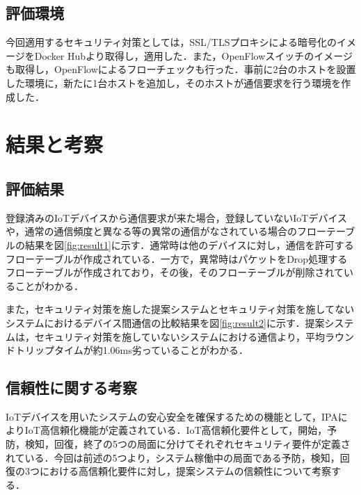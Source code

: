 \documentclass[Japanese]{dicomopapers}
\begin{document}
\subsection{評価環境}
今回適用するセキュリティ対策としては，SSL/TLSプロキシによる暗号化のイメージをDocker Hubより取得し，適用した．また，OpenFlowスイッチのイメージも取得し，OpenFlowによるフローチェックも行った．事前に2台のホストを設置した環境に，新たに1台ホストを追加し，そのホストが通信要求を行う環境を作成した．


\section{結果と考察}
\subsection{評価結果}
登録済みのIoTデバイスから通信要求が来た場合，登録していないIoTデバイスや，通常の通信頻度と異なる等の異常の通信がなされている場合のフローテーブルの結果を図\ref{fig:result1}に示す．通常時は他のデバイスに対し，通信を許可するフローテーブルが作成されている．一方で，異常時はパケットをDrop処理するフローテーブルが作成されており，その後，そのフローテーブルが削除されていることがわかる．\par
また，セキュリティ対策を施した提案システムとセキュリティ対策を施してないシステムにおけるデバイス間通信の比較結果を図\ref{fig:result2}に示す．提案システムは，セキュリティ対策を施していないシステムにおける通信より，平均ラウンドトリップタイムが約1.06ms劣っていることがわかる．

\subsection{信頼性に関する考察}
IoTデバイスを用いたシステムの安心安全を確保するための機能として，IPAによりIoT高信頼化機能が定義されている．IoT高信頼化要件として，開始，予防，検知，回復，終了の5つの局面に分けてそれぞれセキュリティ要件が定義されている\cite{IPA}．今回は前述の5つより，システム稼働中の局面である予防，検知，回復の3つにおける高信頼化要件に対し，提案システムの信頼性について考察する．
\end{document}
